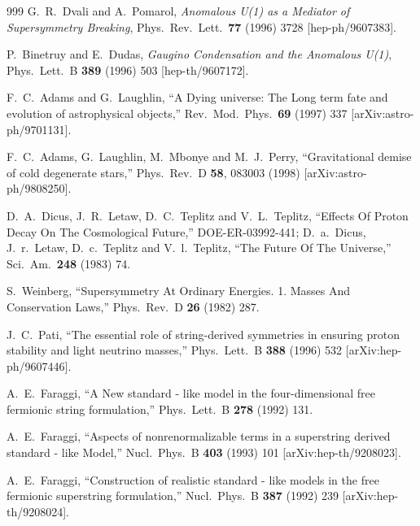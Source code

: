 \begin{thebibliography}{999}
G.~R.~Dvali and A.~Pomarol,
{\it Anomalous U(1) as a Mediator of Supersymmetry Breaking},
Phys.\ Rev.\ Lett.\  {\bf 77} (1996) 3728
[hep-ph/9607383].

P.~Binetruy and E.~Dudas,
{\it Gaugino Condensation and the Anomalous U(1)},
Phys.\ Lett.\ B {\bf 389} (1996) 503
[hep-th/9607172].

  F.~C.~Adams and G.~Laughlin,
  ``A Dying universe: The Long term fate and evolution of astrophysical
  objects,''
  Rev.\ Mod.\ Phys.\  {\bf 69} (1997) 337
  [arXiv:astro-ph/9701131].

  F.~C.~Adams, G.~Laughlin, M.~Mbonye and M.~J.~Perry,
  ``Gravitational demise of cold degenerate stars,''
  Phys.\ Rev.\ D {\bf 58}, 083003 (1998)
  [arXiv:astro-ph/9808250].

  D.~A.~Dicus, J.~R.~Letaw, D.~C.~Teplitz and V.~L.~Teplitz,
  ``Effects Of Proton Decay On The Cosmological Future,''
DOE-ER-03992-441;
  D.~a.~Dicus, J.~r.~Letaw, D.~c.~Teplitz and V.~l.~Teplitz,
  ``The Future Of The Universe,''
  Sci.\ Am.\  {\bf 248} (1983) 74.

  S.~Weinberg,
  ``Supersymmetry At Ordinary Energies. 1. Masses And Conservation Laws,''
  Phys.\ Rev.\ D {\bf 26} (1982) 287.

  J.~C.~Pati,
  ``The essential role of string-derived symmetries in ensuring  proton
  stability and light neutrino masses,''
  Phys.\ Lett.\ B {\bf 388} (1996) 532
  [arXiv:hep-ph/9607446].

  A.~E.~Faraggi,
  ``A New standard - like model in the four-dimensional free fermionic string
  formulation,''
  Phys.\ Lett.\ B {\bf 278} (1992) 131.

  A.~E.~Faraggi,
  ``Aspects of nonrenormalizable terms in a superstring derived standard - like
  Model,''
  Nucl.\ Phys.\ B {\bf 403} (1993) 101
  [arXiv:hep-th/9208023].

  A.~E.~Faraggi,
  ``Construction of realistic standard - like models in the free fermionic
 superstring formulation,''
  Nucl.\ Phys.\ B {\bf 387} (1992) 239
  [arXiv:hep-th/9208024].


\end{thebibliography}
